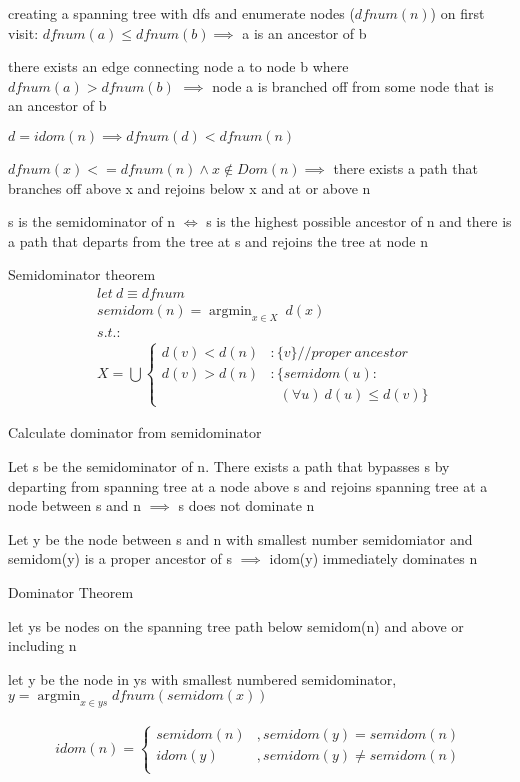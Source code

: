 \documentclass[8pt]{extarticle}
\DeclareMathOperator*{\argmin}{argmin}
\begin{document}
\begin{multicols*}{2}
  creating a spanning tree with dfs and enumerate nodes ($dfnum(n)$) on first visit: $dfnum(a) \leq dfnum(b) \implies$ a is an ancestor of b

  there exists an edge connecting node a to node b where $dfnum(a) > dfnum(b)$ $\implies$ node a is branched off from some node that is an ancestor of b

  $d=idom(n) \implies dfnum(d) < dfnum(n)$

  $dfnum(x) <= dfnum(n) \wedge x \notin Dom(n) \implies$ there exists a path that branches off above x and rejoins below x and at or above n

  s is the semidominator of n $\iff$ s is the highest possible ancestor of n and there is a path that departs from the tree at s and rejoins the tree at node n

  Semidominator theorem
  \begin{align*}
  &let\ d \equiv dfnum\\
  &semidom(n) = \argmin_{x \in X}\ d(x)\\
  &s.t.:\\
  &X = \bigcup \begin{cases}
    d(v) < d(n) &: \{v\}//proper\ ancestor\\
    d(v) > d(n) &: \{ semidom(u):\\
                        &\ \ \ (\forall u)\ d(u) \leq d(v) \}
  \end{cases}
  \end{align*}

  Calculate dominator from semidominator

  Let s be the semidominator of n. There exists a path that bypasses s by departing from spanning tree at a node above s and rejoins spanning tree at a node between s and n $\implies$ s does not dominate n

  Let y be the node between s and n with smallest number semidomiator and semidom(y) is a proper ancestor of s $\implies$ idom(y) immediately dominates n

  Dominator Theorem

  let ys be nodes on the spanning tree path below semidom(n) and above or including n
  
  let y be the node in ys with smallest numbered semidominator, $y=\argmin_{x \in ys} dfnum(semidom(x))$

  \begin{align*}
    idom(n) = \begin{cases}
      semidom(n) &, semidom(y) = semidom(n)\\
      idom(y) &, semidom(y) \neq semidom(n)\\
    \end{cases}
  \end{align*}
  

\end{multicols*}
\end{document}
